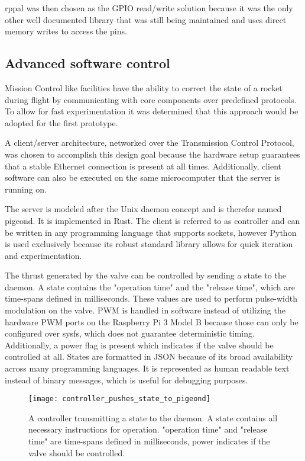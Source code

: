 rppal \cite{rppal} was then chosen as the GPIO read/write solution because it was the only other well documented library that was still being maintained and uses direct memory writes to access the pins.


\subsection{Advanced software control}
Mission Control like facilities have the ability to correct the state of a rocket during flight by communicating with core components over predefined protocols. To allow for fast experimentation it was determined that this approach would be adopted for the first prototype.

A client/server architecture, networked over the Transmission Control Protocol, was chosen to accomplish this design goal because the hardware setup guarantees that a stable Ethernet connection is present at all times. Additionally, client software can also be executed on the same microcomputer that the server is running on.

The server is modeled after the Unix daemon concept and is therefor named pigeond. It is implemented in Rust. The client is referred to as controller and can be written in any programming language that supports sockets, however Python is used exclusively because its robust standard library allows for quick iteration and experimentation.

The thrust generated by the valve can be controlled by sending a state to the daemon. A state contains the "operation time" and the "release time", which are time-spans defined in milliseconds. These values are used to perform pulse-width modulation on the valve. PWM is handled in software instead of utilizing the hardware PWM ports on the Raspberry Pi 3 Model B because those can only be configured over sysfs, which does not guarantee deterministic timing. Additionally, a power flag is present which indicates if the valve should be controlled at all. States are formatted in JSON \cite{json} because of its broad availability across many programming languages. It is represented as human readable text instead of binary messages, which is useful for debugging purposes. 

\begin{figure}[h]
\centering

\texttt{[image: controller\_pushes\_state\_to\_pigeond]}

\caption{A controller transmitting a state to the daemon. A state contains all necessary instructions for operation. "operation time" and "release time" are time-spans defined in milliseconds, power indicates if the valve should be controlled.}
\end{figure}

